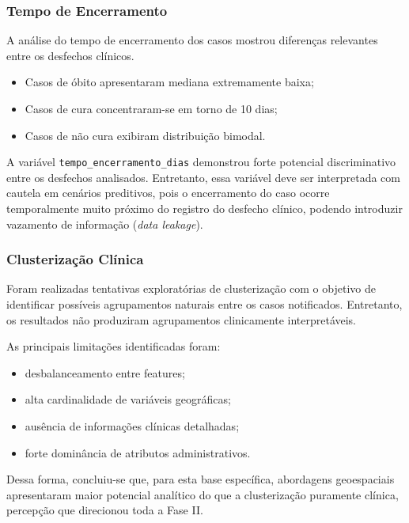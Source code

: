 \documentclass[12pt]{article}
\begin{document}
\subsubsection{Tempo de Encerramento}

A análise do tempo de encerramento dos casos mostrou diferenças relevantes entre os
desfechos clínicos.

\begin{itemize}
    \item Casos de óbito apresentaram mediana extremamente baixa;
    \item Casos de cura concentraram-se em torno de 10 dias;
    \item Casos de não cura exibiram distribuição bimodal.
\end{itemize}

A variável \texttt{tempo\_encerramento\_dias} demonstrou forte potencial discriminativo
entre os desfechos analisados. Entretanto, essa variável deve ser interpretada com
cautela em cenários preditivos, pois o encerramento do caso ocorre temporalmente muito
próximo do registro do desfecho clínico, podendo introduzir vazamento de informação
(\textit{data leakage}).

\subsubsection{Clusterização Clínica}

Foram realizadas tentativas exploratórias de clusterização com o objetivo de identificar
possíveis agrupamentos naturais entre os casos notificados. Entretanto, os resultados
não produziram agrupamentos clinicamente interpretáveis.

As principais limitações identificadas foram:

\begin{itemize}
    \item desbalanceamento entre features;
    \item alta cardinalidade de variáveis geográficas;
    \item ausência de informações clínicas detalhadas;
    \item forte dominância de atributos administrativos.
\end{itemize}

Dessa forma, concluiu-se que, para esta base específica, abordagens geoespaciais
apresentaram maior potencial analítico do que a clusterização puramente clínica,
percepção que direcionou toda a Fase II.
\end{document}
